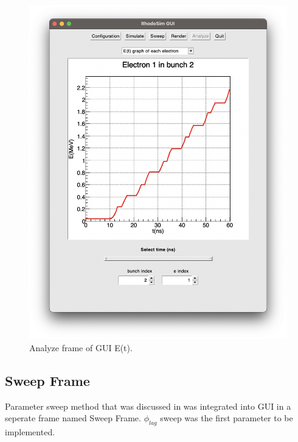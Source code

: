 \documentclass[a4paper,oneside,12pt]{report}
\numberwithin{equation}{chapter}
\begin{document}
{\begin{figure}[h!]
    \centering
    \includegraphics[width=0.9\linewidth]{./figures/rhodoSim/GUI_analyze_Et_3.png}
    \caption{Analyze frame of GUI E(t).}
    \label{fig:gui_analyze_Et}
    \vspace{20pt}
\end{figure}

\subsection{Sweep Frame}
Parameter sweep method that was discussed in  was integrated into GUI in a seperate frame named Sweep Frame.
$\phi_{lag}$ sweep was the first parameter to be implemented. 

}
\end{document}
